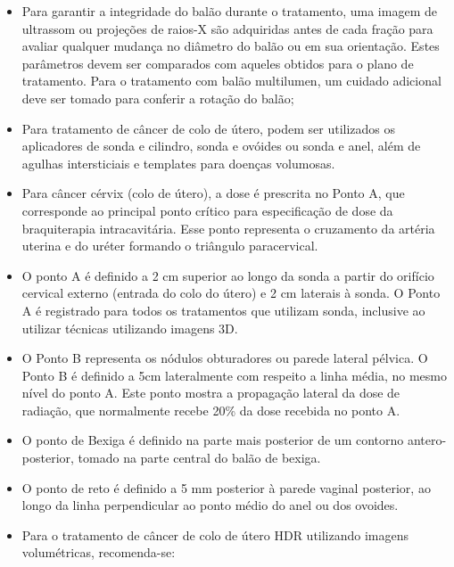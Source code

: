 \documentclass[11pt,a4paper]{article}
\newcounter{exemplo}
\begin{document}
\begin{exemplo}[Braquiterapia]
\begin{itemize}
        \item Para garantir a integridade do balão durante o tratamento, uma imagem de ultrassom ou projeções de raios-X são adquiridas antes de cada fração para avaliar qualquer mudança no diâmetro do balão ou em sua orientação. Estes parâmetros devem ser comparados com aqueles obtidos para o plano de tratamento. Para o tratamento com balão multilumen, um cuidado adicional deve ser tomado para conferir a rotação do balão;
        
        \item Para tratamento de câncer de colo de útero, podem ser utilizados os aplicadores de sonda e cilindro, sonda e ovóides ou sonda e anel, além de agulhas intersticiais e templates para doenças volumosas.
        
        \item Para câncer cérvix (colo de útero), a dose é prescrita no Ponto A, que corresponde ao principal ponto crítico para especificação de dose da braquiterapia intracavitária. Esse ponto representa o cruzamento da artéria uterina e do uréter formando o triângulo paracervical.
        
        \item O ponto A é definido a 2 cm superior ao longo da sonda a partir do orifício cervical externo (entrada do colo do útero) e 2 cm laterais à sonda. O Ponto A é registrado para todos os tratamentos que utilizam sonda, inclusive ao utilizar técnicas utilizando imagens 3D.
        
        \item O Ponto B representa os nódulos obturadores ou parede lateral pélvica. O Ponto B é definido a 5cm lateralmente com respeito a linha média, no mesmo nível do ponto A. Este ponto mostra a propagação lateral da dose de radiação, que normalmente recebe 20\% da dose recebida no ponto A.
        
        \item O ponto de Bexiga é definido na parte mais posterior de um contorno antero-posterior, tomado na parte central do balão de bexiga.
        
        \item O ponto de reto é definido a 5 mm posterior à parede vaginal posterior, ao longo da linha perpendicular ao ponto médio do anel ou dos ovoides. 
        
        \item Para o tratamento de câncer de colo de útero HDR utilizando imagens volumétricas, recomenda-se:
        

\end{itemize}
\end{exemplo}
\end{document}
